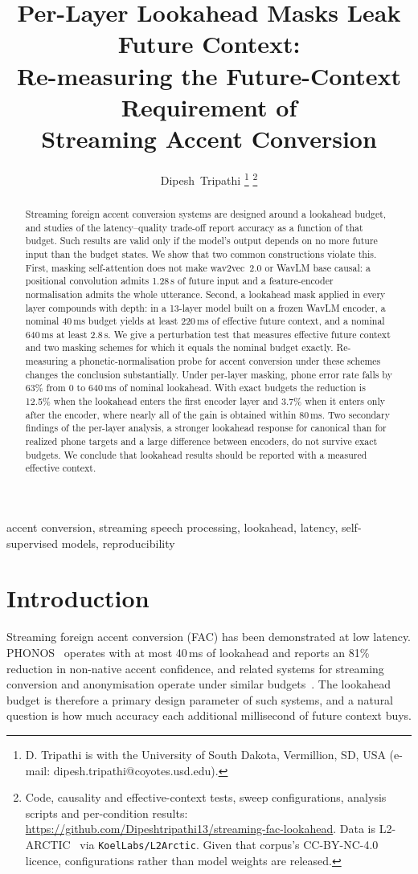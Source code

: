 \documentclass[journal]{IEEEtran}
\title{Per-Layer Lookahead Masks Leak Future Context:\\
Re-measuring the Future-Context Requirement of\\
Streaming Accent Conversion}
\author{Dipesh~Tripathi%
\thanks{D. Tripathi is with the University of South Dakota, Vermillion, SD,
USA (e-mail: dipesh.tripathi@coyotes.usd.edu).}%
\thanks{Code, causality and effective-context tests, sweep configurations,
analysis scripts and per-condition results:
\url{https://github.com/Dipeshtripathi13/streaming-fac-lookahead}. Data is
L2-ARCTIC~\protect\cite{l2arctic2018} via \texttt{KoelLabs/L2Arctic}. Given
that corpus's CC-BY-NC-4.0 licence, configurations rather than model weights
are released.}}
\begin{document}
\maketitle

\begin{abstract}
\noindent Streaming foreign accent conversion systems are designed around a
lookahead budget, and studies of the latency--quality trade-off report
accuracy as a function of that budget. Such results are valid only if the
model's output depends on no more future input than the budget states. We
show that two common constructions violate this. First, masking
self-attention does not make wav2vec~2.0 or WavLM base causal: a positional
convolution admits 1.28\,s of future input and a feature-encoder
normalisation admits the whole utterance. Second, a lookahead mask applied in
every layer compounds with depth: in a 13-layer model built on a frozen WavLM
encoder, a nominal 40\,ms budget yields at least 220\,ms of effective future
context, and a nominal 640\,ms at least 2.8\,s. We give a perturbation test
that measures effective future context and two masking schemes for which it
equals the nominal budget exactly. Re-measuring a phonetic-normalisation
probe for accent conversion under these schemes changes the conclusion
substantially. Under per-layer masking, phone error rate falls by 63\% from 0
to 640\,ms of nominal lookahead. With exact budgets the reduction is 12.5\%
when the lookahead enters the first encoder layer and 3.7\% when it enters
only after the encoder, where nearly all of the gain is obtained within
80\,ms. Two secondary findings of the per-layer analysis, a stronger
lookahead response for canonical than for realized phone targets and a large
difference between encoders, do not survive exact budgets. We conclude that
lookahead results should be reported with a measured effective context.
\end{abstract}

\begin{IEEEkeywords}
accent conversion, streaming speech processing, lookahead, latency,
self-supervised models, reproducibility
\end{IEEEkeywords}

\section{Introduction}

Streaming foreign accent conversion (FAC) has been demonstrated at low
latency. PHONOS~\cite{phonos2026} operates with at most 40\,ms of lookahead
and reports an 81\% reduction in non-native accent confidence, and related
systems for streaming conversion and anonymisation operate under similar
budgets~\cite{tvtsyn2026, darkstream2025}. The lookahead budget is therefore a
primary design parameter of such systems, and a natural question is how much
accuracy each additional millisecond of future context buys.
\end{document}
